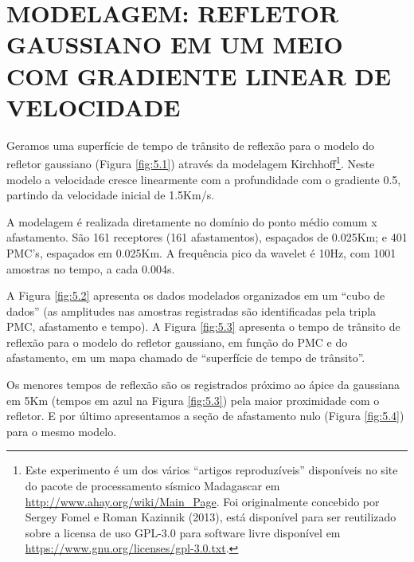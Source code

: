 %
% 
% 
% 
% 
% 
% 

\chapter{MODELAGEM: REFLETOR GAUSSIANO EM UM MEIO COM GRADIENTE LINEAR DE VELOCIDADE}
\label{cap5:modeling}

Geramos uma superfície de tempo de trânsito de reflexão para o modelo do refletor gaussiano (Figura \ref{fig:5.1})
através da modelagem Kirchhoff\footnote{Este experimento é um dos vários ``artigos reproduzíveis'' disponíveis no site
do pacote de processamento sísmico Madagascar em \url{http://www.ahay.org/wiki/Main_Page}. 
Foi originalmente concebido por Sergey Fomel e Roman Kazinnik (2013),
está disponível para ser reutilizado sobre a licensa de uso GPL-3.0 para software livre disponível
em \url{https://www.gnu.org/licenses/gpl-3.0.txt}.}\cite{fomel1}.
Neste modelo a velocidade cresce linearmente com a profundidade com o gradiente 0.5, partindo da velocidade inicial de
1.5Km/s. 

A modelagem é realizada diretamente no domínio do ponto médio comum x afastamento. São 161 receptores (161 afastamentos),
espaçados de 0.025Km; e 401 PMC's, espaçados em 0.025Km. A frequência pico da wavelet é 10Hz, com 1001 amostras no tempo, a
cada 0.004s.

A Figura \ref{fig:5.2} apresenta os dados modelados organizados em um ``cubo de dados'' (as amplitudes nas amostras registradas
são identificadas pela tripla PMC, afastamento e tempo). A Figura \ref{fig:5.3} apresenta o tempo de trânsito de reflexão para o
modelo do refletor gaussiano, em função do PMC e do afastamento, em um mapa chamado de ``superfície de tempo de trânsito''.

Os menores tempos de reflexão são os registrados próximo ao 
ápice da gaussiana em 5Km (tempos em azul na Figura \ref{fig:5.3}) pela maior proximidade com o refletor.
E por último apresentamos a seção de afastamento nulo (Figura \ref{fig:5.4}) para o mesmo modelo.


